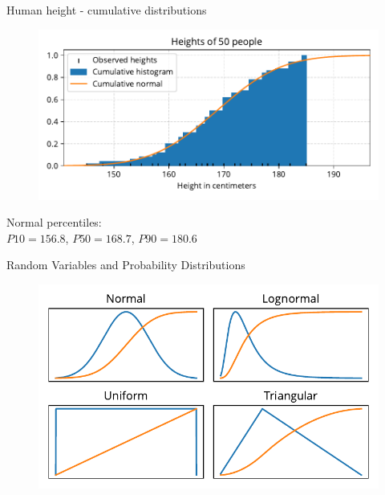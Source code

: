 \documentclass[12pt, aspectratio=149]{beamer}
\theoremstyle{plain}
\begin{document}
\begin{frame}[fragile]{Human height - cumulative distributions}
    \begin{center}
     \begin{figure}
     	\centering
     	\includegraphics[width=0.99\linewidth]{figures/heights_cumulative_3}
     \end{figure}
     Normal percentiles:\\$P10 = 156.8$,\hspace*{1em} $P50 = 168.7$,\hspace*{1em} $P90 = 180.6$
     \end{center}
\end{frame}

\begin{frame}[fragile]{Random Variables and Probability Distributions}
	\begin{figure}
		\centering
		\includegraphics[width=0.99\linewidth]{figures/pdfs_cdfs_v2}
	\end{figure}
\end{frame}
\end{document}
